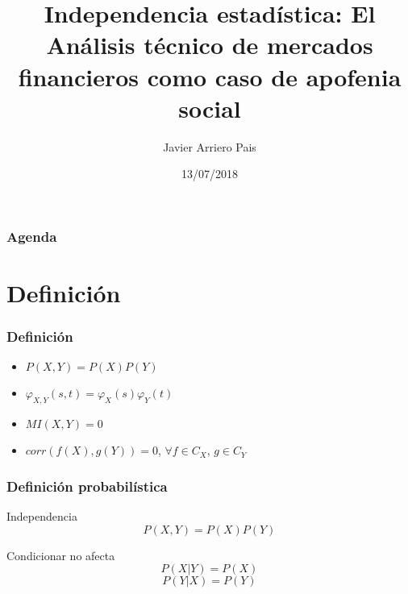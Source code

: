 \documentclass[t,9pt,pdftex]{beamer}
\title[]{Independencia estad\'istica: El An\'alisis t\'ecnico de mercados financieros como caso de apofenia social}
\author{Javier Arriero Pais}
\date{13/07/2018}
\begin{document}

\inserttitlepage



\begin{frame}[c]
	\frametitle{Agenda}
	\tableofcontents[hideallsubsections]
\end{frame}


\section{Definici\'on}



\begin{frame}[c]
	\frametitle{Definici\'on}
	\begin{itemize}
		\item $P(X,Y) = P(X)P(Y)$
		\item $\varphi_{X,Y}(s,t) = \varphi_X(s)\varphi_Y(t)$
		\item $MI(X,Y)=0$
		\item $corr(f(X), g(Y))=0$, $\forall f \in C_X$, $\mbox{} g \in C_Y$
	\end{itemize}
\end{frame}


\begin{frame}[c]
	\frametitle{Definici\'on probabil\'istica}
	\begin{block}{Independencia}
		$$P(X,Y) = P(X)P(Y)$$
	\end{block}
	\begin{exampleblock}{Condicionar no afecta}
		$$P(X|Y)=P(X)$$
		$$P(Y|X)=P(Y)$$
	\end{exampleblock}
\end{frame}
\end{document}

